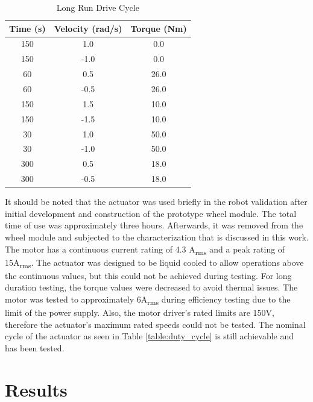 \begin{table}[t]
  \vskip0.2cm
  \caption{Long Run Drive Cycle}
  \label{table:long_run}
  \begin{center}
    \vskip-0.2cm
    \begin{tabular}{|c||c||c|}
    \hline
    Time (s) & Velocity (rad/s) & Torque (Nm)\\
    \hline
    150 & 1.0 & 0.0\\
    \hline
    150 & -1.0 & 0.0\\
    \hline
    60 & 0.5 & 26.0\\
    \hline
    60 & -0.5 & 26.0\\
    \hline
    150 & 1.5 & 10.0\\
    \hline
    150 & -1.5 & 10.0\\
    \hline
    30 & 1.0 & 50.0\\
    \hline
    30 & -1.0 & 50.0\\
    \hline
    300 & 0.5 & 18.0\\
    \hline
    300 & -0.5 & 18.0\\
    \hline
    \end{tabular}
  \end{center}
\end{table}

It should be noted that the actuator was used briefly in the robot validation after initial development and construction of the prototype wheel module.
The total time of use was approximately three hours.
Afterwards, it was removed from the wheel module and subjected to the characterization that is discussed in this work.
The motor has a continuous current rating of 4.3 A\textsubscript{rms} and a peak rating of 15A\textsubscript{rms}.
The actuator was designed to be liquid cooled to allow operations above the continuous values, but this could not be achieved during testing.
For long duration testing, the torque values were decreased to avoid thermal issues.
The motor was tested to approximately 6A\textsubscript{rms} during efficiency testing due to the limit of the power supply.
Also, the motor driver's rated limits are 150V, therefore the actuator's maximum rated speeds could not be tested.
The nominal cycle of the actuator as seen in Table \ref{table:duty_cycle} is still achievable and has been tested.



\section{Results} \label{ch:single:eff_results}

